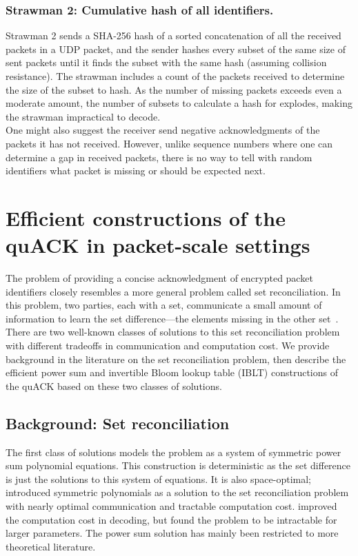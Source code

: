 \subsubsection{Strawman 2: Cumulative hash of all identifiers.}
Strawman 2 sends a SHA-256 hash of a sorted concatenation of all the
received packets in a UDP packet, and the sender hashes every subset of the same size of
sent packets until it finds the subset with the same hash (assuming collision resistance).
The strawman includes
a count of the packets received to determine the size of the subset to hash.
As the number of missing packets exceeds even a moderate amount, the number
of subsets to calculate a hash for explodes, making the strawman impractical to decode.\\

\noindent
One might also suggest the receiver send negative acknowledgments of the packets
it has not received. However, unlike sequence numbers where one can
determine a gap in received packets, there is no way to tell with random
identifiers what packet is missing or should be expected next.

\section{Efficient constructions of the quACK in packet-scale settings}
\label{sec:quack:constructions}

The problem of providing a concise acknowledgment of encrypted packet
identifiers closely resembles a more general problem called set reconciliation.
In this problem, two parties, each with a set, communicate a small amount of
information to learn the set difference---the elements missing in the other
set~\cite{minsky2003set,eppstein2011straggler}. There are two well-known classes
of solutions to this set reconciliation problem with different tradeoffs
in communication and computation cost.
We provide background in the literature on the set reconciliation problem,
then describe the efficient power sum and invertible Bloom lookup table (IBLT)
constructions of the quACK based on these two classes of solutions.

\subsection{Background: Set reconciliation}
\label{sec:quack:constructions:background}

The first class of solutions models the problem as a system of symmetric power
sum polynomial equations. This construction is deterministic as the set
difference is just the solutions to this system of equations. It is also
space-optimal; \cite{minsky2003set} introduced symmetric polynomials as a
solution to the set reconciliation problem with nearly optimal communication
and tractable computation cost. \cite{dodis2004fuzzy} improved the computation
cost in decoding, but found the problem to be intractable for larger parameters.
The power sum solution has mainly been restricted to more theoretical
literature.

